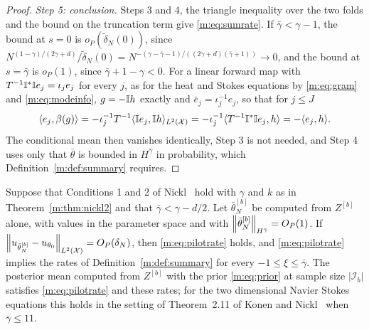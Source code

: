 \begin{proof}
\emph{Step 5: conclusion.} Steps 3 and 4, the triangle inequality over the two folds and the bound on the truncation term give \eqref{m:eq:sumrate}. If $\bar\gamma<\gamma-1$, the bound at $s=0$ is $o_P(\tilde\delta_N(0))$, since $N^{(1-\gamma)/(2\gamma+d)}/\tilde\delta_N(0)=N^{-(\gamma-\bar\gamma-1)/((2\gamma+d)(\bar\gamma+1))}\to0$, and the bound at $s=\bar\gamma$ is $o_P(1)$, since $\bar\gamma+1-\gamma<0$. For a linear forward map with $T^{-1}\mathbb{I}^*\mathbb{I} e_j=\iota_je_j$ for every $j$, as for the heat and Stokes equations by \eqref{m:eq:gram} and \eqref{m:eq:modeinfo}, $g=-\mathbb{I} h$ exactly and $\bar e_j=\iota_j^{-1}e_j$, so that for $j\le J$
\[
\langle e_j,\beta(g)\rangle=-\iota_j^{-1}T^{-1}\langle\mathbb{I} e_j,\mathbb{I} h\rangle_{L^2(\mathcal X)}=-\iota_j^{-1}\langle T^{-1}\mathbb{I}^*\mathbb{I} e_j,h\rangle=-\langle e_j,h\rangle .
\]
The conditional mean then vanishes identically, Step 3 is not needed, and Step 4 uses only that $\bar\theta$ is bounded in $H^{\bar\gamma}$ in probability, which Definition~\ref{m:def:summary} requires.
\end{proof}

\begin{lemma}\label{m:lem:halfmean}
Suppose that Conditions 1 and 2 of Nickl~\cite{nicklbvm2024} hold with $\gamma$ and $k$ as in Theorem~\ref{m:thm:nickl2} and that $\bar\gamma<\gamma-d/2$. Let $\bar\theta^{[b]}_N$ be computed from $Z^{[b]}$ alone, with values in the parameter space and with $\left\|\bar\theta^{[b]}_N\right\|_{H^{\bar\gamma}}=O_P(1)$. If $\left\|u_{\bar\theta^{[b]}_N}-u_{\theta_0}\right\|_{L^2(\mathcal X)}=O_P(\delta_N)$, then \eqref{m:eq:pilotrate} holds, and \eqref{m:eq:pilotrate} implies the rates of Definition~\ref{m:def:summary} for every $-1\le\xi\le\bar\gamma$. The posterior mean computed from $Z^{[b]}$ with the prior \eqref{m:eq:prior} at sample size $|\mathcal I_b|$ satisfies \eqref{m:eq:pilotrate} and these rates; for the two dimensional Navier Stokes equations this holds in the setting of Theorem~2.11 of Konen and Nickl~\cite{konennickl2026} when $\bar\gamma\le11$.
\end{lemma}

